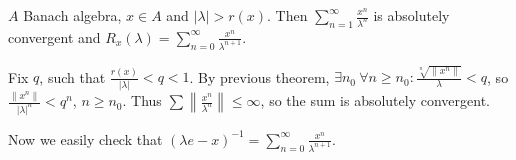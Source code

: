 \documentclass[12pt]{article}					%
\begin{document}
\begin{dusledek}
	$A$ Banach algebra, $x \in A$ and $|\lambda| > r(x)$. Then $\sum_{n=1}^∞ \frac{x^n}{\lambda^n}$ is absolutely convergent and $R_x(\lambda) = \sum_{n=0}^∞ \frac{x^n}{\lambda^{n + 1}}$.

	\begin{dukazin}
		Fix $q$, such that $\frac{r(x)}{|\lambda|} < q < 1$. By previous theorem, $\exists n_0\ \forall n ≥ n_0: \frac{\sqrt[n]{\|x^n\|}}{\lambda} < q$, so $\frac{\|x^n\|}{|\lambda|^n} < q^n$, $n ≥ n_0$. Thus $\sum \left\| \frac{x^n}{\lambda^n}\right\| ≤ ∞$, so the sum is absolutely convergent.

		Now we easily check that $(\lambda e - x)^{-1} = \sum_{n=0}^∞ \frac{x^n}{\lambda^{n + 1}}$.
	\end{dukazin}
\end{dusledek}
\end{document}
